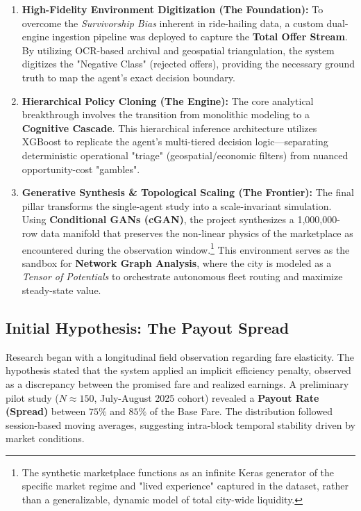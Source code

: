 \begin{enumerate} 
    \item \textbf{High-Fidelity Environment Digitization (The Foundation):} 
    To overcome the \textit{Survivorship Bias} inherent in ride-hailing data, a custom dual-engine ingestion pipeline was deployed to capture the \textbf{Total Offer Stream}. By utilizing OCR-based archival and geospatial triangulation, the system digitizes the "Negative Class" (rejected offers), providing the necessary ground truth to map the agent's exact decision boundary.
    
    \item \textbf{Hierarchical Policy Cloning (The Engine):} 
    The core analytical breakthrough involves the transition from monolithic modeling to a \textbf{Cognitive Cascade}. This hierarchical inference architecture utilizes XGBoost to replicate the agent's multi-tiered decision logic—separating deterministic operational "triage" (geospatial/economic filters) from nuanced opportunity-cost "gambles". 
    
\item \textbf{Generative Synthesis \& Topological Scaling (The Frontier):} 
    The final pillar transforms the single-agent study into a scale-invariant simulation. Using \textbf{Conditional GANs (cGAN)}, the project synthesizes a 1,000,000-row data manifold that preserves the non-linear physics of the marketplace as encountered during the observation window.\footnote{The synthetic marketplace functions as an infinite Keras generator of the specific market regime and "lived experience" captured in the dataset, rather than a generalizable, dynamic model of total city-wide liquidity.} This environment serves as the sandbox for \textbf{Network Graph Analysis}, where the city is modeled as a \textit{Tensor of Potentials} to orchestrate autonomous fleet routing and maximize steady-state value.
    
\end{enumerate}

\subsection{Initial Hypothesis: The Payout Spread}
Research began with a longitudinal field observation regarding fare elasticity. The hypothesis stated that the system applied an implicit efficiency penalty, observed as a discrepancy between the promised fare and realized earnings. A preliminary pilot study ($N \approx 150$, July-August 2025 cohort) revealed a \textbf{Payout Rate (Spread)} between $75\%$ and $85\%$ of the Base Fare. The distribution followed session-based moving averages, suggesting intra-block temporal stability driven by market conditions.

